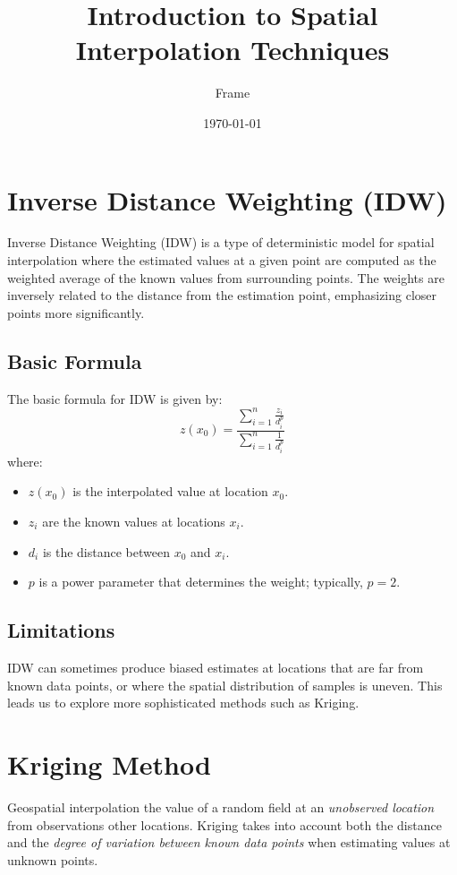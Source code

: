 \documentclass{article}
\begin{document}
\title{Introduction to Spatial Interpolation Techniques}
\author{Frame}
\date{\today}
\maketitle

\section{Inverse Distance Weighting (IDW)}

Inverse Distance Weighting (IDW) is a type of deterministic model for spatial interpolation where the estimated values at a given point are computed as the weighted average of the known values from surrounding points. The weights are inversely related to the distance from the estimation point, emphasizing closer points more significantly.

\subsection{Basic Formula}
The basic formula for IDW is given by:
\[
z(x_0) = \frac{\sum_{i=1}^n \frac{z_i}{d_i^p}}{\sum_{i=1}^n \frac{1}{d_i^p}}
\]
where:
\begin{itemize}
    \item $z(x_0)$ is the interpolated value at location $x_0$.
    \item $z_i$ are the known values at locations $x_i$.
    \item $d_i$ is the distance between $x_0$ and $x_i$.
    \item $p$ is a power parameter that determines the weight; typically, $p = 2$.
\end{itemize}

\subsection{Limitations}
IDW can sometimes produce biased estimates at locations that are far from known data points, or where the spatial distribution of samples is uneven. This leads us to explore more sophisticated methods such as Kriging.

\section{Kriging Method}

Geospatial interpolation the value of a random field at an \emph{unobserved location} from observations other locations. Kriging takes into account both the distance and the \emph{degree of variation between known data points} when estimating values at unknown points.
\end{document}
